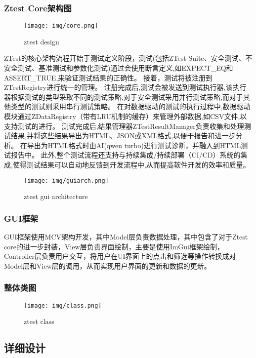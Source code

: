 \documentclass{article}
\begin{document}
\subsubsection{Ztest Core架构图}
\begin{figure}[H]
    \centering
    \texttt{[image: img/core.png]} %
    \caption{ ztest design}
    \label{fig:ztest design }
\end{figure}
ZTest的核心架构流程开始于测试定义阶段，测试(包括ZTest Suite、安全测试、不安全测试、基准测试和参数化测试)通过会使用断言定义,如EXPECT\_EQ和ASSERT\_TRUE,来验证测试结果的正确性。
接着，测试将被注册到ZTestRegistry进行统一的管理。
注册完成后,测试会被发送到测试执行器,该执行器根据测试的类型采取不同的测试策略,对于安全测试采用并行测试策略,而对于其他类型的测试则采用串行测试策略。
在对数据驱动的测试的执行过程中,数据驱动模块通过ZDataRegistry（带有LRU机制的缓存）来管理外部数据,如CSV文件,以支持测试的进行。
测试完成后,结果管理器ZTestResultManager负责收集和处理测试结果,并将这些结果导出为HTML、JSON或XML格式,以便于报告和进一步分析。
在导出为HTML格式时由AI(qwen turbo)进行测试诊断，并融入到HTML测试报告中。
此外,整个测试流程还支持与持续集成/持续部署（CI/CD）系统的集成,使得测试结果可以自动地反馈到开发流程中,从而提高软件开发的效率和质量。
\begin{figure}[H]
    \centering
    \texttt{[image: img/guiarch.png]} %
    \caption{ ztest gui architecture}
    \label{fig:ztest gui architecture }
\end{figure}
\subsubsection{GUI框架}
GUI框架使用MCV架构开发，其中Model层负责数据处理，其中包含了对于Ztest core的进一步封装，View层负责界面绘制，主要是使用ImGui框架绘制，Controller层负责用户交互，将用户在UI界面上的点击和筛选等操作转换成对Model层和View层的调用，从而实现用户界面的更新和数据的更新。
\subsubsection{整体类图}
\begin{figure}[H]
    \centering
    \texttt{[image: img/class.png]} %
    \caption{ ztest class}
    \label{fig:ztest class }
\end{figure}
\subsection{详细设计}
\end{document}
